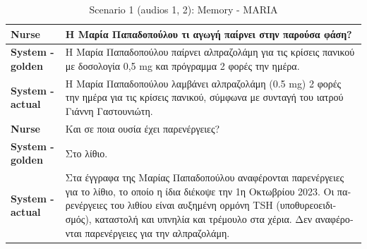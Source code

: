 \begin{table}[H]
\centering
\renewcommand{\arraystretch}{1.5} 
\begin{tabular}{|>{\bfseries}l|p{11cm}|}
\hline
Nurse & \textgreek{Η Μαρία Παπαδοπούλου τι αγωγή παίρνει στην παρούσα φάση?} \\
\hline
System - golden & \textgreek{Η Μαρία Παπαδοπούλου παίρνει αλπραζολάμη για τις κρίσεις πανικού με δοσολογία 0,5 mg και πρόγραμμα 2 φορές την ημέρα.} \\
\hline
System - actual & \textgreek{Η Μαρία Παπαδοπούλου λαμβάνει αλπραζολάμη (0.5 m}g) \textgreek{2 φορές την ημέρα για τις κρίσεις πανικού, σύμφωνα με συνταγή του ιατρού Γιάννη Γαστουνιώτη.} \\
\hline
Nurse & \textgreek{Και σε ποια ουσία έχει παρενέργειες?} \\
\hline
System - golden & \textgreek{Στο λίθιο.} \\
\hline
System - actual & \textgreek{Στα έγγραφα της Μαρίας Παπαδοπούλου αναφέρονται παρενέργειες για το λίθιο, το οποίο η ίδια διέκοψε την 1η Οκτωβρίου 2023. Οι παρενέργειες του λιθίου είναι αυξημένη ορμόνη} TSH  \textgreek{(υποθυρεοειδισμός), καταστολή και υπνηλία και τρέμουλο στα χέρια. Δεν αναφέρονται παρενέργειες για την αλπραζολάμη.} \\
\hline
\end{tabular}
\caption{Scenario 1 (audios 1, 2): Memory - MARIA}
\end{table}

